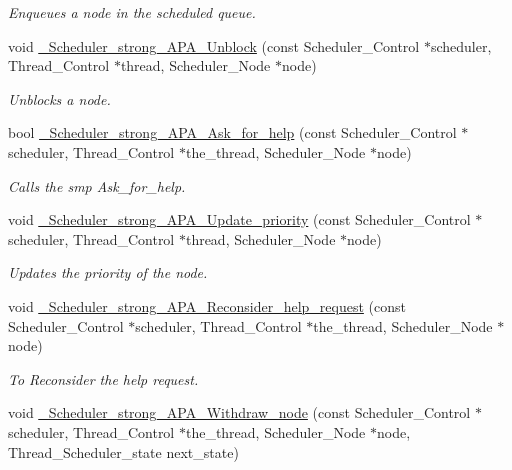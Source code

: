 \begin{DoxyCompactItemize}
\begin{DoxyCompactList}\small\item\em Enqueues a node in the scheduled queue. \end{DoxyCompactList}\item 
void \hyperlink{group__RTEMSScoreSchedulerStrongAPA_ga8e6ee051e6a359186fd6964051db69e2}{\+\_\+\+Scheduler\+\_\+strong\+\_\+\+A\+P\+A\+\_\+\+Unblock} (const Scheduler\+\_\+\+Control $\ast$scheduler, Thread\+\_\+\+Control $\ast$thread, Scheduler\+\_\+\+Node $\ast$node)
\begin{DoxyCompactList}\small\item\em Unblocks a node. \end{DoxyCompactList}\item 
bool \hyperlink{group__RTEMSScoreSchedulerStrongAPA_gad863eddc3fa4e2d785fb64af6505e90b}{\+\_\+\+Scheduler\+\_\+strong\+\_\+\+A\+P\+A\+\_\+\+Ask\+\_\+for\+\_\+help} (const Scheduler\+\_\+\+Control $\ast$scheduler, Thread\+\_\+\+Control $\ast$the\+\_\+thread, Scheduler\+\_\+\+Node $\ast$node)
\begin{DoxyCompactList}\small\item\em Calls the smp Ask\+\_\+for\+\_\+help. \end{DoxyCompactList}\item 
void \hyperlink{group__RTEMSScoreSchedulerStrongAPA_gafd1bbcb35f99dd53b4ffe2fe52030cdc}{\+\_\+\+Scheduler\+\_\+strong\+\_\+\+A\+P\+A\+\_\+\+Update\+\_\+priority} (const Scheduler\+\_\+\+Control $\ast$scheduler, Thread\+\_\+\+Control $\ast$thread, Scheduler\+\_\+\+Node $\ast$node)
\begin{DoxyCompactList}\small\item\em Updates the priority of the node. \end{DoxyCompactList}\item 
void \hyperlink{group__RTEMSScoreSchedulerStrongAPA_ga7809e64065ec5d291f3dc82220a68d3f}{\+\_\+\+Scheduler\+\_\+strong\+\_\+\+A\+P\+A\+\_\+\+Reconsider\+\_\+help\+\_\+request} (const Scheduler\+\_\+\+Control $\ast$scheduler, Thread\+\_\+\+Control $\ast$the\+\_\+thread, Scheduler\+\_\+\+Node $\ast$node)
\begin{DoxyCompactList}\small\item\em To Reconsider the help request. \end{DoxyCompactList}\item 
void \hyperlink{group__RTEMSScoreSchedulerStrongAPA_gaf43eb65a6fbbe2826ca4cec68a930cb5}{\+\_\+\+Scheduler\+\_\+strong\+\_\+\+A\+P\+A\+\_\+\+Withdraw\+\_\+node} (const Scheduler\+\_\+\+Control $\ast$scheduler, Thread\+\_\+\+Control $\ast$the\+\_\+thread, Scheduler\+\_\+\+Node $\ast$node, Thread\+\_\+\+Scheduler\+\_\+state next\+\_\+state)

\end{DoxyCompactItemize}
